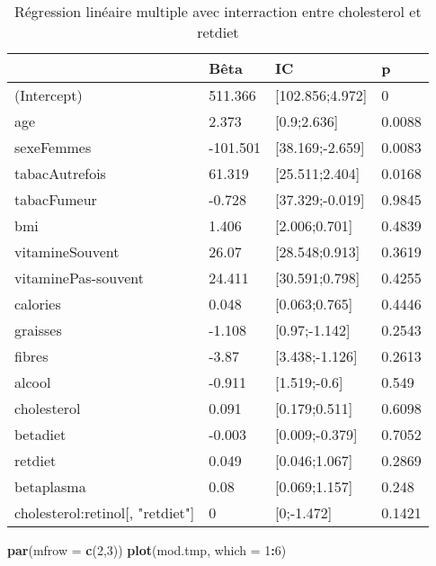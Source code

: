 \documentclass[]{article}
\newenvironment{Shaded}{\begin{snugshade}}{\end{snugshade}}
\newcommand{\KeywordTok}[1]{\textcolor[rgb]{0.13,0.29,0.53}{\textbf{#1}}}
\newcommand{\DataTypeTok}[1]{\textcolor[rgb]{0.13,0.29,0.53}{#1}}
\newcommand{\DecValTok}[1]{\textcolor[rgb]{0.00,0.00,0.81}{#1}}
\newcommand{\OperatorTok}[1]{\textcolor[rgb]{0.81,0.36,0.00}{\textbf{#1}}}
\newcommand{\NormalTok}[1]{#1}
\begin{document}
\begin{table}

\caption{\label{tab:unnamed-chunk-78}Régression linéaire multiple avec interraction entre cholesterol et retdiet}
\centering
\begin{tabular}[t]{l|l|l|l}
\hline
  & Bêta & IC & p\\
\hline
\rowcolor[HTML]{BBD2E1}  (Intercept) & 511.366 & [102.856;4.972] & 0\\
\hline
age & 2.373 & [0.9;2.636] & 0.0088\\
\hline
\rowcolor[HTML]{BBD2E1}  sexeFemmes & -101.501 & [38.169;-2.659] & 0.0083\\
\hline
tabacAutrefois & 61.319 & [25.511;2.404] & 0.0168\\
\hline
\rowcolor[HTML]{BBD2E1}  tabacFumeur & -0.728 & [37.329;-0.019] & 0.9845\\
\hline
bmi & 1.406 & [2.006;0.701] & 0.4839\\
\hline
\rowcolor[HTML]{BBD2E1}  vitamineSouvent & 26.07 & [28.548;0.913] & 0.3619\\
\hline
vitaminePas-souvent & 24.411 & [30.591;0.798] & 0.4255\\
\hline
\rowcolor[HTML]{BBD2E1}  calories & 0.048 & [0.063;0.765] & 0.4446\\
\hline
graisses & -1.108 & [0.97;-1.142] & 0.2543\\
\hline
\rowcolor[HTML]{BBD2E1}  fibres & -3.87 & [3.438;-1.126] & 0.2613\\
\hline
alcool & -0.911 & [1.519;-0.6] & 0.549\\
\hline
\rowcolor[HTML]{BBD2E1}  cholesterol & 0.091 & [0.179;0.511] & 0.6098\\
\hline
betadiet & -0.003 & [0.009;-0.379] & 0.7052\\
\hline
\rowcolor[HTML]{BBD2E1}  retdiet & 0.049 & [0.046;1.067] & 0.2869\\
\hline
betaplasma & 0.08 & [0.069;1.157] & 0.248\\
\hline
\rowcolor[HTML]{BBD2E1}  cholesterol:retinol[, "retdiet"] & 0 & [0;-1.472] & 0.1421\\
\hline
\end{tabular}
\end{table}

\begin{Shaded}
\begin{Highlighting}[]
\KeywordTok{par}\NormalTok{(}\DataTypeTok{mfrow =} \KeywordTok{c}\NormalTok{(}\DecValTok{2}\NormalTok{,}\DecValTok{3}\NormalTok{))}
\KeywordTok{plot}\NormalTok{(mod.tmp, }\DataTypeTok{which =} \DecValTok{1}\OperatorTok{:}\DecValTok{6}\NormalTok{)}
\end{Highlighting}
\end{Shaded}
\end{document}
